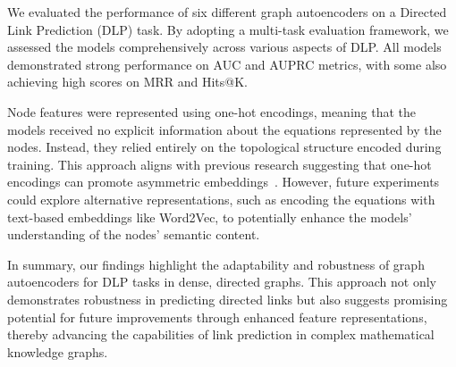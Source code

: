 We evaluated the performance of six different graph autoencoders on a Directed Link Prediction (DLP) task.
By adopting a multi-task evaluation framework, we assessed the models comprehensively across various
aspects of DLP. All models demonstrated strong performance on AUC and AUPRC metrics, with some also
achieving high scores on MRR and Hits@K.

Node features were represented using one-hot encodings, meaning that the models received no explicit
information about the equations represented by the nodes. Instead, they relied entirely on the
topological structure encoded during training. This approach aligns with previous research suggesting
that one-hot encodings can promote asymmetric embeddings~\cite{Salha2019}. However, future experiments
could explore alternative representations, such as encoding the equations with text-based embeddings
like Word2Vec, to potentially enhance the models' understanding of the nodes' semantic content.

In summary, our findings highlight the adaptability and robustness of graph autoencoders for DLP
tasks in dense, directed graphs. This approach not only demonstrates robustness in predicting directed
links but also suggests promising potential for future improvements through enhanced feature
representations, thereby advancing the capabilities of link prediction in complex mathematical
knowledge graphs.

